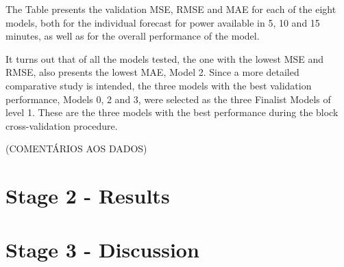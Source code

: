 The Table presents the validation \ac{MSE}, \ac{RMSE} and \ac{MAE} for each of the eight models, both for the individual forecast for power available in 5, 10 and 15 minutes, as well as for the overall performance of the model.


It turns out that of all the models tested, the one with the lowest \ac{MSE} and \ac{RMSE}, also presents the lowest \ac{MAE}, Model 2. Since a more detailed comparative study is intended, the three models with the best validation performance, Models 0, 2 and 3, were selected as the three Finalist Models of level 1. These are the three models with the best performance during the block cross-validation procedure. 


(COMENTÁRIOS AOS DADOS)

\section{Stage 2 - Results}\label{chap3:section:stage_2}

\section{Stage 3 - Discussion}\label{chap3:section:stage_3}